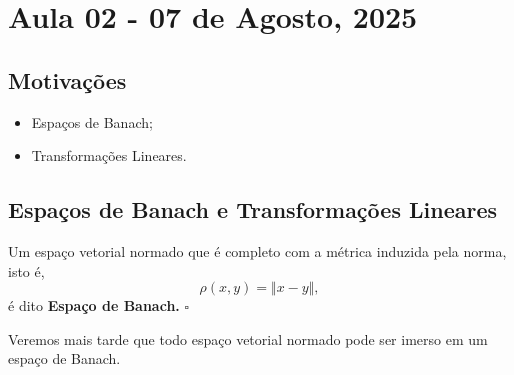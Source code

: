 \documentclass[../functional_analysis.tex]{subfiles}
\begin{document}
\section{Aula 02 - 07 de Agosto, 2025}
\subsection{Motivações}
\begin{itemize}
	\item Espaços de Banach;
	\item Transformações Lineares.
\end{itemize}
\subsection{Espaços de Banach e Transformações Lineares}
\begin{def*}
	Um espaço vetorial normado que é completo com a métrica induzida pela norma, isto é,
	\[
		\rho (x, y) = \Vert x-y \Vert,
	\]
	é dito \textbf{Espaço de Banach.} \(\square\)
\end{def*}
Veremos mais tarde que todo espaço vetorial normado pode ser imerso em um espaço de Banach.
\end{document}
